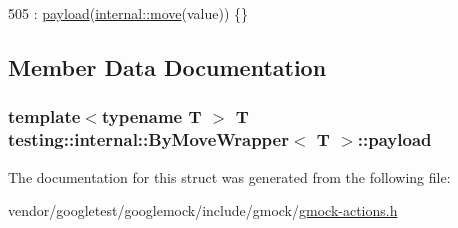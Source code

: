 \begin{DoxyCode}
505 : \hyperlink{structtesting_1_1internal_1_1ByMoveWrapper_ae8407b1ae99db3f00797d68b9ee9e870}{payload}(\hyperlink{namespacetesting_1_1internal_a0f6d06bf8c3093b9c22bb08723db201e}{internal::move}(value)) \{\}
\end{DoxyCode}


\subsection{Member Data Documentation}
\subsubsection[{\texorpdfstring{payload}{payload}}]{\setlength{\rightskip}{0pt plus 5cm}template$<$typename T $>$ T {\bf testing\+::internal\+::\+By\+Move\+Wrapper}$<$ T $>$\+::payload}\hypertarget{structtesting_1_1internal_1_1ByMoveWrapper_ae8407b1ae99db3f00797d68b9ee9e870}{}\label{structtesting_1_1internal_1_1ByMoveWrapper_ae8407b1ae99db3f00797d68b9ee9e870}


The documentation for this struct was generated from the following file\+:\begin{DoxyCompactItemize}
\item 
vendor/googletest/googlemock/include/gmock/\hyperlink{gmock-actions_8h}{gmock-\/actions.\+h}\end{DoxyCompactItemize}
